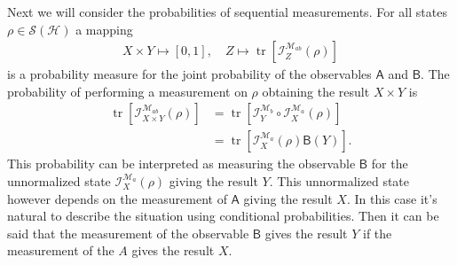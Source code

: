 \documentclass[a4paper,12pt]{wihuri}
\theoremstyle{definition}
\numberwithin{definition}{section}
\numberwithin{example}{section}
\numberwithin{theorem}{section}
\numberwithin{proposition}{section}
\numberwithin{lemma}{section}
\newcommand{\I}{\mathcal{I}}%
\newcommand{\hi}{\mathcal{H}}%
\newcommand{\tila}{\mathcal{S}}%
\newcommand{\mm}{\mathcal{M}}%
\newcommand{\A}{\mathsf{A}}%
\newcommand{\B}{\mathsf{B}}%
\DeclareMathOperator{\tr}{tr}
\begin{document}
Next we will consider the probabilities of sequential measurements. For all states $\rho \in \tila(\hi)$ a mapping
\begin{align*}
X \times Y \mapsto [0,1], \quad Z \mapsto \tr[\I_{Z}^{\mm_{ab}}(\rho)]
\end{align*}
is a probability measure for the joint probability of the observables $\A$ and $\B$. The probability of performing a measurement on $\rho$ obtaining the result $X \times Y$ is
\begin{align*}
\tr[\I_{X\times Y}^{\mm_{ab}}(\rho)] &= \tr[\I_Y^{\mm_b} \circ \I_X^{\mm_a}(\rho)] \\
&= \tr[\I_X^{\mm_a}(\rho)\B(Y)]\text{.}
\end{align*}
This probability can be interpreted as measuring the observable $\B$ for the unnormalized state $\I_X^{\mm_a}(\rho)$ giving the result $Y$. This unnormalized state however depends on the measurement of $\A$ giving the result $X$. In this case it's natural to describe the situation using conditional probabilities. Then it can be said that the measurement of the observable $\B$ gives the result $Y$ if the measurement of the $A$ gives the result $X$.
\end{document}
